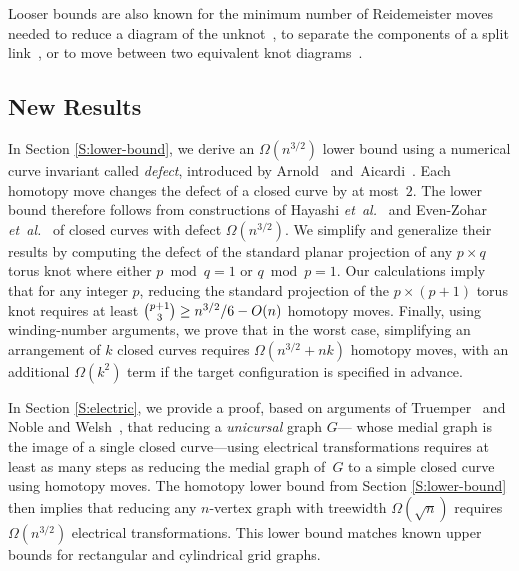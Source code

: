 \documentclass[11pt,twoside]{article}
\def\arcto{\mathord\shortrightarrow}
\def\etal{\emph{et~al.}}			%
\let\EDIT\relax
\numberwithin{figure}{section}
\begin{document}
Looser bounds are also known for the minimum number of Reidemeister moves needed to reduce a diagram of the unknot~\cite{hn-udrqn-10,l-pubrm-15}, to separate the components of a split link~\cite{hhn-unnrm-12}, or to move between two equivalent knot diagrams~\cite{hh-msrmd-11,cl-ubrm-14}.

\subsection{New Results}

In Section \ref{S:lower-bound}, we derive an $\Omega(n^{3/2})$ lower bound using a numerical curve invariant called \emph{defect}, introduced by Arnold~\cite{a-tipcc-94, a-pctip-94} and~Aicardi~\cite{a-tc-94}.  Each homotopy move changes the defect of a closed curve by at most~$2$.  The lower bound therefore follows from constructions of Hayashi \etal~\cite{hh-msrmd-11,hhsy-musrm-12} and Even-Zohar \etal~\cite{ehln-irkl-14} of closed curves with defect $\Omega(n^{3/2})$.  We simplify and generalize their results by computing the defect of the standard planar projection of any $p\times q$ torus knot where either $p\bmod q = 1$ or $q\bmod p = 1$. Our calculations imply that for any integer $p$, reducing the standard projection of the $p\times (p+1)$ torus knot requires at least $\smash{\binom{p+1}{3}} \ge n^{3/2}/6 - O(n)$ homotopy moves.  Finally, using winding-number arguments, we prove that in the worst case, simplifying an arrangement of $k$ closed curves requires $\Omega(n^{3/2}+ nk)$ homotopy moves, with an additional $\Omega(k^2)$ term if the target configuration is specified in advance.


In Section \ref{S:electric}, we provide a proof, based on arguments of Truemper~\cite{t-drpg-89} and Noble and Welsh~\cite{nw-kg-00}, that reducing a \emph{unicursal} \EDIT{plane} graph $G$---\EDIT{one} whose medial graph is the image of a single closed curve---using \EDIT{facial} electrical transformations requires at least as many steps as reducing the medial graph of~$G$ to a simple closed curve using homotopy moves.  The homotopy lower bound from Section \ref{S:lower-bound} then implies that reducing any $n$-vertex \EDIT{plane} graph with treewidth $\Omega(\sqrt{n})$ requires $\Omega(n^{3/2})$ \EDIT{facial} electrical transformations.  This lower bound matches known upper bounds for rectangular and cylindrical grid graphs.  
\end{document}
